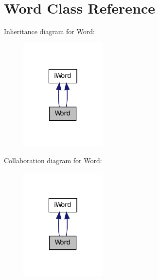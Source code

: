 \hypertarget{classWord}{
\section{Word Class Reference}
\label{classWord}
}


Inheritance diagram for Word:\nopagebreak
\begin{figure}[H]
\begin{center}
\leavevmode
\includegraphics[width=122pt]{classWord__inherit__graph}
\end{center}
\end{figure}


Collaboration diagram for Word:\nopagebreak
\begin{figure}[H]
\begin{center}
\leavevmode
\includegraphics[width=122pt]{classWord__coll__graph}
\end{center}
\end{figure}
